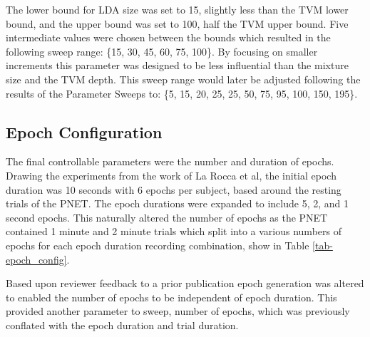 The lower bound for \ac{LDA} size was set to 15, slightly less than the \ac{TVM} lower bound, and the upper bound was set to 100, half the \ac{TVM} upper bound. Five intermediate values were chosen between the bounds which resulted in the following sweep range: \{15, 30, 45, 60, 75, 100\}. By focusing on smaller increments this parameter was designed to be less influential than the mixture size and the \ac{TVM} depth. This sweep range would later be adjusted following the results of the Parameter Sweeps to: \{5, 15, 20, 25, 25, 50, 75, 95, 100, 150, 195\}.

\subsection{Epoch Configuration}

The final controllable parameters were the number and duration of epochs. Drawing the experiments from the work of La Rocca et al, the initial epoch duration was 10 seconds with 6 epochs per subject, based around the resting trials of the \ac{PNET}. The epoch durations were expanded to include 5, 2, and 1 second epochs. This naturally altered the number of epochs as the \ac{PNET} contained 1 minute and 2 minute trials which split into a various numbers of epochs for each epoch duration recording combination, show in Table \ref{tab-epoch_config}.

\medskip
\noindent{}
\medskip

Based upon reviewer feedback to a prior publication \cite{Ward2019} epoch generation was altered to enabled the number of epochs to be independent of epoch duration. This provided another parameter to sweep, number of epochs, which was previously conflated with the epoch duration and trial duration.

